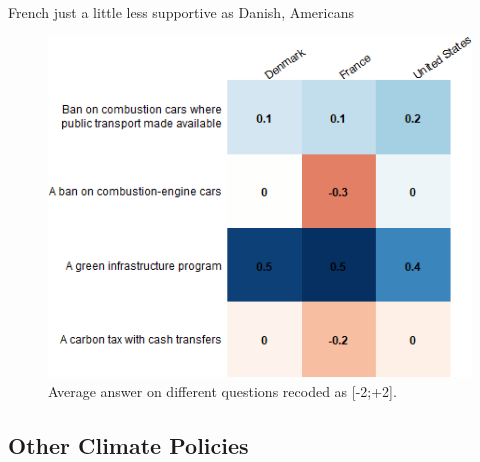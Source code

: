 \begin{framefont}{\small}
\begin{frame}{French just a little less supportive as Danish, Americans}%
\begin{figure}[h!]
\centering
\caption{Average answer on different questions recoded as [-2;+2].}
\includegraphics[height=.8\paperheight]{../figures/country_comparison/policies_all_support_mean_countries.png}
\end{figure}
\end{frame}
\subsection{Other Climate Policies}


\end{framefont}
